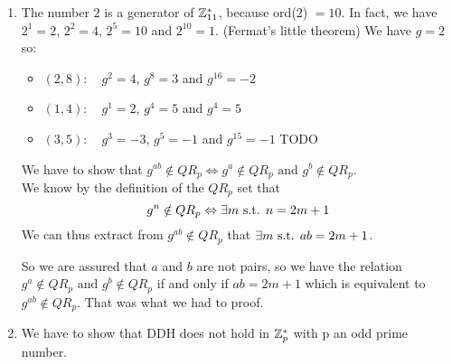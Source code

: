 \begin{solution}
\begin{enumerate}
		\item
		The number $2$ is a generator of $\mathbb{Z}_{11}^*$, because ord($2$) $= 10$. In fact, we have $2^1 = 2$, $2^2 = 4$, $2^5 = 10$ and $2^10 = 1$. (Fermat's little theorem)
		We have $g = 2$ so:
		\begin{itemize}
			\item $(2,8):\quad g^2 = 4$, $g^8 = 3$ and $g^{16} = -2$
			\item $(1,4):\quad g^1 = 2$, $g^4 = 5$ and $g^{4} = 5$
			\item $(3,5):\quad g^3 = -3$, $g^5 = -1$ and $g^{15} = -1$ TODO
		\end{itemize}
		We have to show that $g^{ab} \notin QR_p \Leftrightarrow g^a \notin QR_p \text{ and } g^b \notin QR_p$.\\
		We know by the definition of the $QR_p$ set that
		\[g^n \notin QR_p \Leftrightarrow \exists m \text{ s.t. } n = 2m+1\]
		We can thus extract from $g^{ab} \notin QR_p$ that $\exists m \text{ s.t. } ab = 2m+1$.


		So we are assured that $a$ and $b$ are not pairs, so we have the relation $g^a \notin QR_p \text{ and } g^b \notin QR_p$ if and only if $ab = 2m+1$ which is equivalent to $g^{ab} \notin QR_p$. That was what we had to proof.

		\item
		We have to show that DDH does not hold in $\mathbb{Z}_p^*$ with p an odd prime number.


\end{enumerate}
\end{solution}
